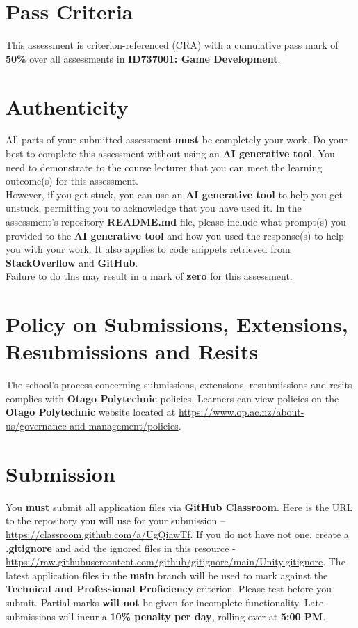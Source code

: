 \documentclass{article}
\begin{document}
\section*{Pass Criteria}
This assessment is criterion-referenced (CRA) with a cumulative pass mark of \textbf{50\%} over all assessments in \textbf{ID737001: Game Development}.

\section*{Authenticity}
All parts of your submitted assessment \textbf{must} be completely your work. Do your best to complete this assessment without using an \textbf{AI generative tool}. You need to demonstrate to the course lecturer that you can meet the learning outcome(s) for this assessment. \\
 
 However, if you get stuck, you can use an \textbf{AI generative tool} to help you get unstuck, permitting you to acknowledge that you have used it. In the assessment's repository \textbf{README.md} file, please include what prompt(s) you provided to the \textbf{AI generative tool} and how you used the response(s) to help you with your work. It also applies to code snippets retrieved from \textbf{StackOverflow} and \textbf{GitHub}. \\
 
 Failure to do this may result in a mark of \textbf{zero} for this assessment.

\section*{Policy on Submissions, Extensions, Resubmissions and Resits}
The school's process concerning submissions, extensions, resubmissions and resits complies with \textbf{Otago Polytechnic} policies. Learners can view policies on the \textbf{Otago Polytechnic} website located at \href{https://www.op.ac.nz/about-us/governance-and-management/policies}{https://www.op.ac.nz/about-us/governance-and-management/policies}.

\section*{Submission}
You \textbf{must} submit all application files via \textbf{GitHub Classroom}. Here is the URL to the repository you will use for your submission – \href{https://classroom.github.com/a/UgQiawTf}{https://classroom.github.com/a/UgQiawTf}. If you do not have not one, create a \textbf{.gitignore} and add the ignored files in this resource - \href{https://raw.githubusercontent.com/github/gitignore/main/Unity.gitignore}{https://raw.githubusercontent.com/github/gitignore/main/Unity.gitignore}. The latest application files in the \textbf{main} branch will be used to mark against the \textbf{Technical and Professional Proficiency} criterion. Please test before you submit. Partial marks \textbf{will not} be given for incomplete functionality. Late submissions will incur a \textbf{10\% penalty per day}, rolling over at \textbf{5:00 PM}.
\end{document}
